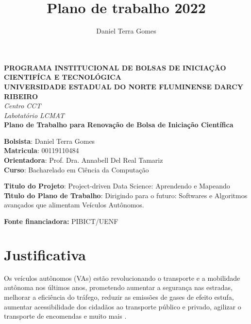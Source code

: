 \documentclass{article}
\title{Plano de trabalho 2022}
\author{Daniel Terra Gomes}
\begin{document}
\begin{titlepage}
\begin{center}
\large
\textbf{PROGRAMA INSTITUCIONAL DE BOLSAS DE INICIA\c{C}\~{A}O CIENTIF\'{I}CA E TECNOL\'{O}GICA\\\vspace{0,5cm}
UNIVERSIDADE ESTADUAL DO NORTE FLUMINENSE DARCY RIBEIRO\\
}
\textit{Centro CCT \\
Labotat\'{o}rio LCMAT\\
\vspace{1cm}}
\vspace{1,5cm}
\textbf{Plano de Trabalho para Renovação de Bolsa de Iniciação Científica}\\\vspace{5cm}
\end{center}
\textbf{Bolsista}: Daniel Terra Gomes\\
\textbf{Matricula}: 00119110484\\
\textbf{Orientadora}: Prof. Dra. Annabell Del Real Tamariz  \\
\textbf{Curso}: Bacharelado em Ci\^{e}ncia da Computa\c{c}\~{a}o\\
\vspace{3cm}
\begin{center}
\textbf{Titulo do Projeto}: Project-driven Data Science: Aprendendo e Mapeando\\
\textbf{T\'{\i}tulo do Plano de Trabalho}: Dirigindo para o futuro: Softwares e Algoritmos avançados que alimentam Veículos Autônomos.

\textbf{Fonte financiadora:} PIBICT/UENF
\end{center}
\end{titlepage}


\section{Justificativa}

Os veículos autônomos (VAs) estão revolucionando o transporte e a mobilidade autônoma nos últimos anos, prometendo aumentar a segurança nas estradas, melhorar a eficiência do tráfego, reduzir as emissões de gases de efeito estufa, aumentar acessibilidade dos cidadãos ao transporte público e privado, agilizar o transporte de encomendas e muito mais \cite{review-auto, intro-pm, mundobrasil}.
\end{document}
